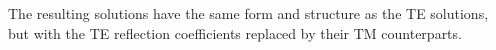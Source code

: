 The resulting solutions have the same form and structure as the TE solutions, but with 
the TE reflection coefficients replaced by their TM counterparts.  

